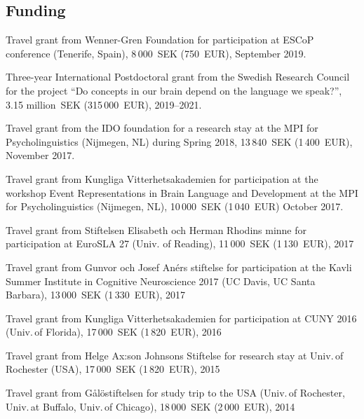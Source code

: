 \documentclass[margin, 11pt]{res} %
\begin{document}
\begin{resume}
\section{\sc Funding}


Travel grant from Wenner-Gren Foundation for participation at ESCoP conference (Tenerife, Spain), 8\,000~SEK (750~EUR), September 2019.

Three-year International Postdoctoral grant from the Swedish Research Council for the project ``Do concepts in our brain depend on the language we speak?'', 3.15 million~SEK (315\,000~EUR), 2019--2021.

Travel grant from the IDO foundation for a research stay at the MPI for Psycholinguistics (Nijmegen, NL) during Spring 2018, 13\,840~SEK (1\,400~EUR), November 2017.

Travel grant from Kungliga Vitterhetsakademien for participation at the workshop Event Representations in Brain Language and Development at the MPI for Psycholinguistics (Nijmegen, NL), 10\,000~SEK (1\,040~EUR) October 2017.

Travel grant from Stiftelsen Elisabeth och Herman Rhodins minne for participation at EuroSLA 27 (Univ. of Reading), 11\,000~SEK (1\,130~EUR), 2017

Travel grant from Gunvor och Josef An\'{e}rs stiftelse for participation at the Kavli Summer Institute in Cognitive Neuroscience 2017 (UC Davis, UC Santa Barbara), 13\,000~SEK (1\,330~EUR), 2017

Travel grant from Kungliga Vitterhetsakademien for participation at CUNY 2016 (Univ.\,of Florida), 17\,000~SEK (1\,820~EUR), 2016

Travel grant from Helge Ax:son Johnsons Stiftelse for research stay at Univ.\,of Rochester (USA), 17\,000~SEK (1\,820~EUR), 2015

Travel grant from G\aa l\"{o}stiftelsen for study trip to the USA (Univ.\,of Rochester, Univ.\,at Buffalo, Univ.\,of Chicago), 18\,000~SEK (2\,000~EUR), 2014
 










\end{resume}
\end{document}

